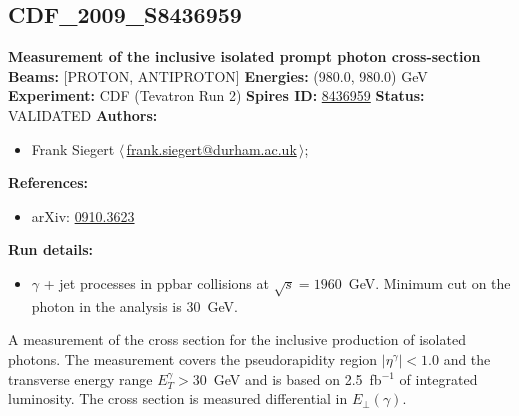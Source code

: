\subsection[CDF\_2009\_S8436959]{CDF\_2009\_S8436959\,\cite{Aaltonen:2009ty}}
\textbf{Measurement of the inclusive isolated prompt photon cross-section}\newline
\textbf{Beams:} [PROTON, ANTIPROTON] \newline
\textbf{Energies:} (980.0, 980.0) GeV \newline
\textbf{Experiment:} CDF (Tevatron Run 2) \newline
\textbf{Spires ID:} \href{http://www.slac.stanford.edu/spires/find/hep/www?rawcmd=key+8436959}{8436959}\newline
\textbf{Status:} VALIDATED\newline
\textbf{Authors:}
\begin{itemize}
  \item Frank Siegert $\langle\,$\href{mailto:frank.siegert@durham.ac.uk}{frank.siegert@durham.ac.uk}$\,\rangle$;
\end{itemize}
\textbf{References:}
\begin{itemize}
  \item arXiv: \href{http://arxiv.org/abs/0910.3623}{0910.3623}
\end{itemize}
\textbf{Run details:}
\begin{itemize}

  \item $\gamma$ + jet processes in ppbar collisions at $\sqrt{s} = 1960$~GeV. Minimum \pT cut on the photon in the analysis is 30~GeV.\end{itemize}

\noindent A measurement of the cross section for the inclusive production of isolated photons. The measurement covers the pseudorapidity region $|\eta^\gamma|<1.0$ and the transverse energy range $E_T^\gamma>30$~GeV and is based on 2.5~fb$^{-1}$ of integrated luminosity. The cross section is measured differential in $E_\perp(\gamma)$.

\clearpage


\clearpage

